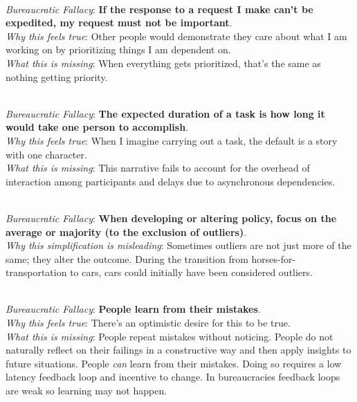 \ \\
\textit{Bureaucratic Fallacy}: \textbf{If the response to a request I make can't be expedited, my request must not be important}.  \\
\textit{Why this feels true}: Other people would demonstrate they care about what I am working on by prioritizing things I am dependent on.\\
\textit{What this is missing}: When everything gets prioritized, that's the same as nothing getting priority.

\ \\
\textit{Bureaucratic Fallacy}: \textbf{The expected duration of a task is how long it would take one person to accomplish}.  \\
\textit{Why this feels true}: When I imagine carrying out a task, the default is a story with one character. \\
\textit{What this is missing}: This narrative fails to account for the overhead of interaction among participants and delays due to asynchronous dependencies.~\cite{1975_brooks}


\ \\
\textit{Bureaucratic Fallacy}: \textbf{When developing or altering policy, focus on the average or majority (to the exclusion of outliers)}. \\
\textit{Why this simplification is misleading}: Sometimes outliers are not just more of the same; they alter the outcome. During the transition from horses-for-transportation to cars, cars could initially have been considered outliers. 

\ \\
\textit{Bureaucratic Fallacy}: \textbf{People learn from their mistakes}. \\
\textit{Why this feels true}: There's an optimistic desire for this to be true. \\
\textit{What this is missing}: 
People repeat mistakes without noticing. People do not naturally reflect on their failings in a constructive way and then apply insights to future situations.
People \textit{can} learn from their mistakes. Doing so requires a low latency feedback loop and incentive to change. In bureaucracies feedback loops are weak so learning may not happen.


